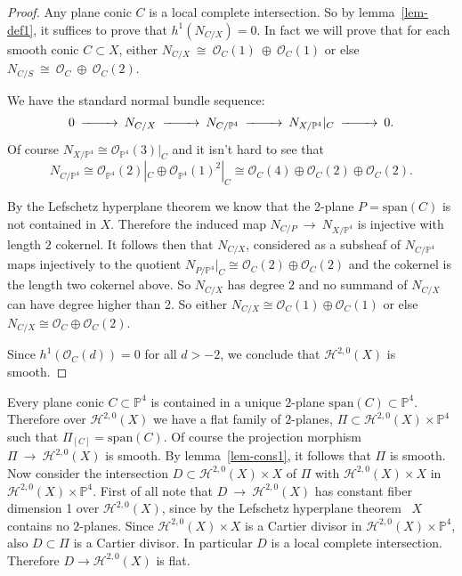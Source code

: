 \documentclass[twoside,12pt,reqno]{amsart}
\theoremstyle{plain}
\theoremstyle{definition}
\newcommand{\Hdg}[2]{\mathcal{H}^{#1,#2}}
\newcommand{\PP}{\mathbb{P}}
\def\ps{\vspace{4pt}}
\newcommand{\OO}{\mathcal O}
\begin{document}
\begin{proof}

Any plane conic $C$ is a local complete
intersection.  So by lemma~\ref{lem-def1}, it suffices to prove that
$h^1(N_{C/X})=0$.  In fact we will prove that for each smooth conic
$C\subset X$, either $N_{C/X}~\cong~\OO_C(1)~\oplus~\OO_C(1)$ or else
$N_{C/S}~\cong~\OO_C~\oplus~\OO_C(2)$.    

\ps

We have the standard normal bundle
sequence:
\begin{equation}
\begin{CD}
 0 @>>> N_{C/X} @>>> N_{C/\PP^4} @>>> N_{X/\PP^4}|_C @>>> 0.
\end{CD} 
\end{equation}
Of course $N_{X/\PP^4}\cong \OO_{\PP^4}(3)|_C$ and it isn't hard to
see that 
\begin{equation}
N_{C/\PP^4}\cong \OO_{\PP^4}(2)|_C \oplus
\OO_{\PP^4}(1)^2|_C \cong \OO_C(4)\oplus \OO_C(2)\oplus \OO_C(2).
\end{equation}

\ps

By the Lefschetz hyperplane theorem we know that the 2-plane
$P=\text{span}(C)$ is not contained in $X$.  Therefore the induced map
$N_{C/P} ~\rightarrow~ N_{X/\PP^4}$ is injective with length $2$
cokernel.  It follows then that $N_{C/X}$, considered as a subsheaf of 
$N_{C/\PP^4}$ maps injectively to the quotient $N_{P/\PP^4}|_C \cong
\OO_C(2)\oplus \OO_C(2)$ and the cokernel is the length two cokernel
above.  So $N_{C/X}$ has degree $2$ and no summand of $N_{C/X}$ can
have degree higher than 2.  So either $N_{C/X}\cong \OO_C(1)\oplus
\OO_C(1)$ or else $N_{C/X}\cong \OO_C\oplus \OO_C(2)$.

\ps

Since $h^1(\OO_C(d)) = 0$ for all $d> -2$, we conclude that
$\Hdg{2}{0}(X)$ is smooth.
\end{proof}

Every plane conic $C\subset \PP^4$ is contained in a unique
$2$-plane $\text{span}(C)\subset \PP^4$.  Therefore over
$\Hdg{2}{0}(X)$ we have a flat family of $2$-planes, $\Pi\subset
\Hdg{2}{0}(X)\times \PP^4$ such that $\Pi_{[C]} = \text{span}(C)$.  Of
course the projection morphism $\Pi~\rightarrow~\Hdg{2}{0}(X)$ is
smooth.  By lemma~\ref{lem-cons1}, it follows that $\Pi$ is smooth.
Now consider the intersection $D\subset \Hdg{2}{0}(X)\times X$ of
$\Pi$ with $\Hdg{2}{0}(X)\times X$ in  
$\Hdg{2}{0}(X)\times \PP^4$.  First of all note that
$D~\rightarrow~\Hdg{2}{0}(X)$ 
has constant fiber dimension 1 over $\Hdg{2}{0}(X)$, since by the
Lefschetz hyperplane theorem~\cite[p. 156]{GH} $X$ contains no
$2$-planes.  Since 
$\Hdg{2}{0}(X)\times X$ is a Cartier divisor in $\Hdg{2}{0}(X)\times
\PP^4$, also $D\subset \Pi$ is a Cartier divisor.  In particular $D$
is a local complete intersection.  Therefore $D\rightarrow
\Hdg{2}{0}(X)$ is flat.  
\end{document}
